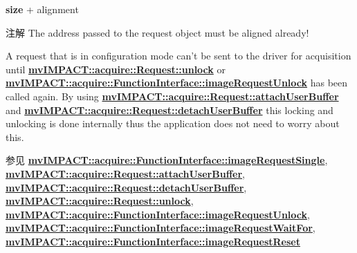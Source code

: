 {\bfseries size} + alignment

\begin{DoxyNote}{注解}
The address passed to the request object must be aligned already!

A request that is in configuration mode can't be sent to the driver for acquisition until {\bfseries \hyperlink{classmv_i_m_p_a_c_t_1_1acquire_1_1_request_a3c30ced407d20caef49e3148257cd91e}{mv\+I\+M\+P\+A\+C\+T\+::acquire\+::\+Request\+::unlock}} or {\bfseries \hyperlink{classmv_i_m_p_a_c_t_1_1acquire_1_1_function_interface_a378a338217d5a681e880a0d9395f1a62}{mv\+I\+M\+P\+A\+C\+T\+::acquire\+::\+Function\+Interface\+::image\+Request\+Unlock}} has been called again. By using {\bfseries \hyperlink{classmv_i_m_p_a_c_t_1_1acquire_1_1_request_acd8f58a136dafcb2bae251da383e2b18}{mv\+I\+M\+P\+A\+C\+T\+::acquire\+::\+Request\+::attach\+User\+Buffer}} and {\bfseries \hyperlink{classmv_i_m_p_a_c_t_1_1acquire_1_1_request_a154f54b267a1d9860d1206b2138ef8d0}{mv\+I\+M\+P\+A\+C\+T\+::acquire\+::\+Request\+::detach\+User\+Buffer}} this locking and unlocking is done internally thus the application does not need to worry about this.
\end{DoxyNote}
\begin{DoxySeeAlso}{参见}
{\bfseries \hyperlink{classmv_i_m_p_a_c_t_1_1acquire_1_1_function_interface_a59571120b5e81c3af596ea5da5dc63ba}{mv\+I\+M\+P\+A\+C\+T\+::acquire\+::\+Function\+Interface\+::image\+Request\+Single}}, ~\newline
 {\bfseries \hyperlink{classmv_i_m_p_a_c_t_1_1acquire_1_1_request_acd8f58a136dafcb2bae251da383e2b18}{mv\+I\+M\+P\+A\+C\+T\+::acquire\+::\+Request\+::attach\+User\+Buffer}}, ~\newline
 {\bfseries \hyperlink{classmv_i_m_p_a_c_t_1_1acquire_1_1_request_a154f54b267a1d9860d1206b2138ef8d0}{mv\+I\+M\+P\+A\+C\+T\+::acquire\+::\+Request\+::detach\+User\+Buffer}}, ~\newline
 {\bfseries \hyperlink{classmv_i_m_p_a_c_t_1_1acquire_1_1_request_a3c30ced407d20caef49e3148257cd91e}{mv\+I\+M\+P\+A\+C\+T\+::acquire\+::\+Request\+::unlock}}, ~\newline
 {\bfseries \hyperlink{classmv_i_m_p_a_c_t_1_1acquire_1_1_function_interface_a378a338217d5a681e880a0d9395f1a62}{mv\+I\+M\+P\+A\+C\+T\+::acquire\+::\+Function\+Interface\+::image\+Request\+Unlock}}, ~\newline
 {\bfseries \hyperlink{classmv_i_m_p_a_c_t_1_1acquire_1_1_function_interface_a4cefdfda8e8940736ae9a4c97b6de8c9}{mv\+I\+M\+P\+A\+C\+T\+::acquire\+::\+Function\+Interface\+::image\+Request\+Wait\+For}}, ~\newline
 {\bfseries \hyperlink{classmv_i_m_p_a_c_t_1_1acquire_1_1_function_interface_a234b2c6e31f3e83629501da47095c54f}{mv\+I\+M\+P\+A\+C\+T\+::acquire\+::\+Function\+Interface\+::image\+Request\+Reset}} 
\end{DoxySeeAlso}
